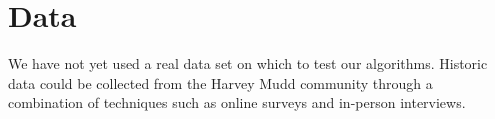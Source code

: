 \documentclass{article}
\begin{document}
\section{Data}
	We have not yet used a real data set on which to test our algorithms.
	Historic data could be collected from the Harvey Mudd community through a combination of techniques such as online surveys and in-person interviews.










\end{document}
